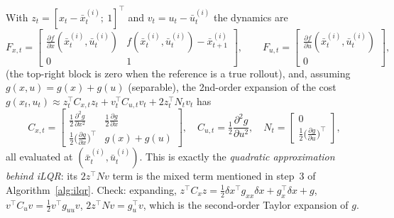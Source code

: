 \documentclass[11pt,a4paper]{article}
\theoremstyle{plain}
\theoremstyle{definition}
\theoremstyle{remark}
\begin{document}
With $z_t=[x_t-\bar x^{(i)}_t;\ 1]^\top$ and $v_t=u_t-\bar u^{(i)}_t$ the dynamics are
\[
F_{x,t}=\begin{bmatrix}\frac{\partial f}{\partial x}(\bar x^{(i)}_t,\bar u^{(i)}_t)&f(\bar x^{(i)}_t,\bar u^{(i)}_t)-\bar x^{(i)}_{t+1}\\0&1\end{bmatrix},\qquad
F_{u,t}=\begin{bmatrix}\frac{\partial f}{\partial u}(\bar x^{(i)}_t,\bar u^{(i)}_t)\\0\end{bmatrix},
\]
(the top-right block is zero when the reference is a true rollout), and, assuming $g(x,u)=g(x)+g(u)$ (separable), the 2nd-order expansion of the cost $g(x_t,u_t)\approx z_t^\top C_{x,t}z_t+v_t^\top C_{u,t}v_t+2z_t^\top N_tv_t$ has
\[
C_{x,t}=\begin{bmatrix}\tfrac12\frac{\partial^2g}{\partial x^2}&\tfrac12\frac{\partial g}{\partial x}\\\tfrac12\big(\frac{\partial g}{\partial x}\big)^\top&g(x)+g(u)\end{bmatrix},\quad
C_{u,t}=\tfrac12\frac{\partial^2g}{\partial u^2},\quad
N_t=\begin{bmatrix}0\\\tfrac12\big(\frac{\partial g}{\partial u}\big)^\top\end{bmatrix},
\]
all evaluated at $(\bar x^{(i)}_t,\bar u^{(i)}_t)$. This is exactly the \emph{quadratic approximation behind iLQR}: its $2z^\top Nv$ term is the mixed term mentioned in step~3 of Algorithm~\ref{alg:ilqr}. Check: expanding, $z^\top C_xz=\tfrac12\delta x^\top g_{xx}\delta x+g_x^\top\delta x+g$, $v^\top C_uv=\tfrac12v^\top g_{uu}v$, $2z^\top Nv=g_u^\top v$, which is the second-order Taylor expansion of $g$.
\end{document}
